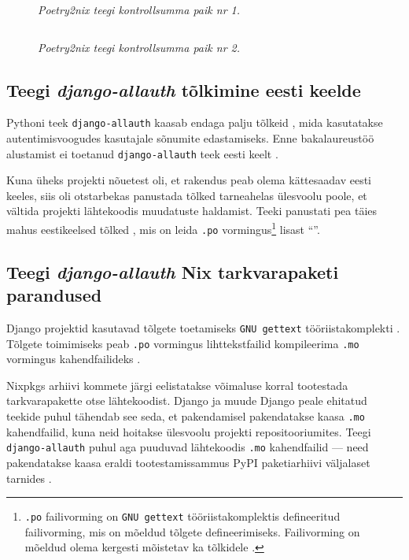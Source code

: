 \begin{figure}
\inputminted[breaklines]{diff}{chapters/data/poetry2nix-patch1.diff}
\caption{\emph{Poetry2nix teegi kontrollsumma paik nr 1.}}\label{fig:poetry2nix-patch1}
\end{figure}

\begin{figure}
\inputminted[breaklines]{diff}{chapters/data/poetry2nix-patch2.diff}
\caption{\emph{Poetry2nix teegi kontrollsumma paik nr 2.}}\label{fig:poetry2nix-patch2}
\end{figure}

\subsection{Teegi \textit{django-allauth} tõlkimine eesti keelde}

Pythoni teek \texttt{django-allauth} kaasab endaga palju tõlkeid \cite{django-allauth-i18n}, mida kasutatakse autentimisvoogudes kasutajale sõnumite edastamiseks. Enne bakalaureustöö alustamist ei toetanud \texttt{django-allauth} teek eesti keelt \cite{django-allauth-pre-et-i18n}.

Kuna üheks projekti nõuetest oli, et rakendus peab olema kättesaadav eesti keeles, siis oli otstarbekas panustada tõlked tarneahelas ülesvoolu poole, et vältida projekti lähtekoodis muudatuste haldamist. Teeki panustati pea täies mahus eestikeelsed tõlked \cite{django-allauth-et-i18n-pr}, mis on leida \texttt{.po} vormingus\footnote{\texttt{.po} failivorming on \texttt{GNU gettext} tööriistakomplektis defineeritud failivorming, mis on mõeldud tõlgete defineerimiseks. Failivorming on mõeldud olema kergesti mõistetav ka tõlkidele \cite{gnu-gettext-po}.} lisast ``''.

\subsection{Teegi \textit{django-allauth} Nix tarkvarapaketi parandused}\label{subsec:compile-mo}

Django projektid kasutavad tõlgete toetamiseks \texttt{GNU gettext} tööriistakomplekti \cite{django-gettext}. Tõlgete toimimiseks peab \texttt{.po} vormingus lihttekstfailid kompileerima \texttt{.mo} vormingus kahendfailideks \cite{django-gettext}.

Nixpkgs arhiivi kommete järgi eelistatakse võimaluse korral tootestada tarkvarapakette otse lähtekoodist. Django ja muude Django peale ehitatud teekide puhul tähendab see seda, et pakendamisel pakendatakse kaasa \texttt{.mo} kahendfailid, kuna neid hoitakse ülesvoolu projekti repositooriumites. Teegi \texttt{django-allauth} puhul aga puuduvad lähtekoodis \texttt{.mo} kahendfailid — need pakendatakse kaasa eraldi tootestamissammus PyPI paketiarhiivi väljalaset tarnides \cite{django-allauth-no-mo-files}.

